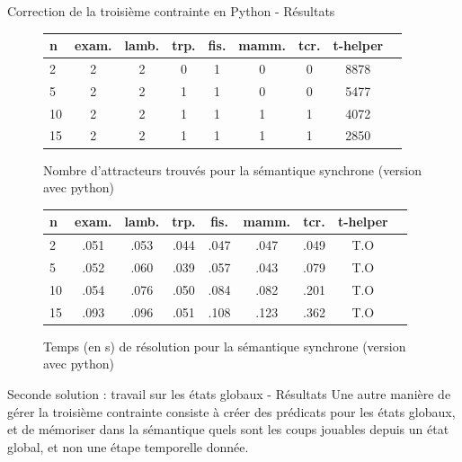 \documentclass{beamer}
\begin{document}
\begin{frame}{Correction de la troisième contrainte en Python - Résultats}
	\begin{figure}[!h]
		\begin{tabular}{l|c<{\onslide<2->}c<{\onslide<3->}c<{\onslide<4->}c<{\onslide<5->}c<{\onslide<6->}c<{\onslide<7->}c<{\onslide}c}
			n & exam. & lamb. & trp. & fis. & mamm. & tcr. & t-helper \\ \hline
			2     & 2 & 2 & 0 & 1 & 0 & 0 & 8878\\
			5     & 2 & 2 & 1 & 1 & 0 & 0 & 5477\\
			10    & 2 & 2 & 1 & 1 & 1 & 1 & 4072\\
			15    & 2 & 2 & 1 & 1 & 1 & 1 & 2850
		\end{tabular}
		\caption{Nombre d'attracteurs trouvés pour la sémantique synchrone (version avec python)}
		\label{label-figure5}
	\end{figure}
	
	\begin{figure}[!h]
		\begin{tabular}{l|c<{\onslide<2->}c<{\onslide<3->}c<{\onslide<4->}c<{\onslide<5->}c<{\onslide<6->}c<{\onslide<7->}c<{\onslide}c}
			n & exam. & lamb. & trp. & fis. & mamm. & tcr. & t-helper \\ \hline
			2     & .051 & .053 & .044 & .047 & .047 & .049 & T.O\\
			5     & .052 & .060 & .039 & .057 & .043 & .079 & T.O\\
			10    & .054 & .076 & .050 & .084 & .082 & .201 & T.O\\
			15    & .093 & .096 & .051 & .108 & .123 & .362 & T.O
		\end{tabular}
		\caption{Temps (en s) de résolution pour la sémantique synchrone (version avec python)}
		\label{label-figure5}
	\end{figure}
\end{frame}

\begin{frame}{Seconde solution : travail sur les états globaux - Résultats}
	\pause
	Une autre manière de gérer la troisième contrainte consiste à créer des prédicats pour les états globaux, et de mémoriser dans la sémantique quels sont les coups jouables depuis un état global, et non une étape temporelle 	
	donnée.\\
	
\end{frame}
\end{document}
